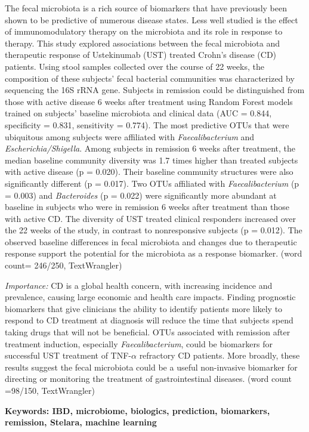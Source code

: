 \documentclass[12pt,]{article}
\begin{document}
The fecal microbiota is a rich source of biomarkers that have previously
been shown to be predictive of numerous disease states. Less well
studied is the effect of immunomodulatory therapy on the microbiota and
its role in response to therapy. This study explored associations
between the fecal microbiota and therapeutic response of Ustekinumab
(UST) treated Crohn's disease (CD) patients. Using stool samples
collected over the course of 22 weeks, the composition of these
subjects' fecal bacterial communities was characterized by sequencing
the 16S rRNA gene. Subjects in remission could be distinguished from
those with active disease 6 weeks after treatment using Random Forest
models trained on subjects' baseline microbiota and clinical data (AUC =
0.844, specificity = 0.831, sensitivity = 0.774). The most predictive
OTUs that were ubiquitous among subjects were affiliated with
\emph{Faecalibacterium} and \emph{Escherichia/Shigella}. Among subjects
in remission 6 weeks after treatment, the median baseline community
diversity was 1.7 times higher than treated subjects with active disease
(p = 0.020). Their baseline community structures were also significantly
different (p = 0.017). Two OTUs affiliated with \emph{Faecalibacterium}
(p = 0.003) and \emph{Bacteroides} (p = 0.022) were significantly more
abundant at baseline in subjects who were in remission 6 weeks after
treatment than those with active CD. The diversity of UST treated
clinical responders increased over the 22 weeks of the study, in
contrast to nonresponsive subjects (p = 0.012). The observed baseline
differences in fecal microbiota and changes due to therapeutic response
support the potential for the microbiota as a response biomarker. (word
count= 246/250, TextWrangler)

\emph{Importance:} CD is a global health concern, with increasing
incidence and prevalence, causing large economic and health care
impacts. Finding prognostic biomarkers that give clinicians the ability
to identify patients more likely to respond to CD treatment at diagnosis
will reduce the time that subjects spend taking drugs that will not be
beneficial. OTUs associated with remission after treatment induction,
especially \emph{Faecalibacterium}, could be biomarkers for successful
UST treatment of TNF-\({\alpha}\) refractory CD patients. More broadly,
these results suggest the fecal microbiota could be a useful
non-invasive biomarker for directing or monitoring the treatment of
gastrointestinal diseases. (word count =98/150, TextWrangler)

\textbf{Keywords: IBD, microbiome, biologics, prediction, biomarkers,
remission, Stelara, machine learning}
\end{document}
